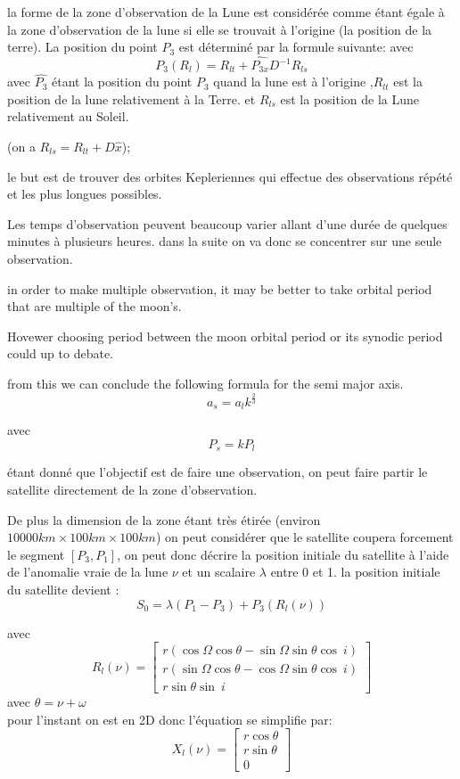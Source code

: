 \documentclass{article} %
\begin{document}
		la forme de la zone d'observation de la Lune est considérée comme étant égale à la zone d'observation de la lune si elle se trouvait à l'origine (la position de la terre). La position du point $P_3$ est déterminé par la formule suivante:
		avec 
		$$
		P_3(R_l)=R_{lt}+\hat{P_{3x}}D^{-1}R_{ls}
		$$
		avec $\hat{P_3}$ étant la position du point $P_3$ quand la lune est à l'origine
		,$R_{lt}$ est la position de la lune relativement à la Terre.
		et $R_{ls}$ est la position de la Lune relativement au Soleil.
		
		(on a $R_{ls} = R_{lt}+D\hat{x}$);
		
		le but est de trouver des orbites Kepleriennes qui effectue des observations répété et les plus longues possibles.
		
		Les temps d'observation peuvent beaucoup varier allant d'une durée de quelques minutes à plusieurs heures.	dans la suite on va donc se concentrer sur une seule observation.
		
		
		in order to make multiple observation, it may be better to take orbital period that are multiple of the moon's.
		
		Hovewer choosing period between the moon orbital period or its synodic period could up to debate.
		
		from this we can conclude the following formula for the semi major axis.
		$$
		a_s=a_lk^{\frac{2}{3}}
		$$
		
		avec
		$$
		P_s=kP_l
		$$
		
		étant donné que l'objectif est de faire une observation, on peut faire partir le satellite directement de la zone d'observation.
		
		De plus la dimension de la zone étant très étirée (environ $10000km\times100km\times100km$) on peut considérer que le satellite coupera forcement le segment $[P_3,P_1]$, on peut donc décrire la position initiale du satellite à l'aide de l'anomalie vraie de la lune $\nu$ et un scalaire $\lambda$ entre 0 et 1. la position initiale du satellite devient : 
		$$
		S_0=\lambda(P_1-P_3)+P_3(R_l(\nu))
		$$
		
		avec 
		$$
		R_l(\nu)=\begin{bmatrix}
			r( \cos\Omega \cos\theta -\sin\Omega \sin\theta \cos\ i)\\
			r( \sin\Omega \cos\theta -\cos\Omega \sin\theta \cos\ i)\\
			r\sin\theta \sin\ i\ 
		\end{bmatrix}
		$$
		avec $\theta = \nu+\omega$ \\
		pour l'instant on est en 2D donc l'équation se simplifie par:
		$$
		X_l(\nu)=\begin{bmatrix}
			r \cos\theta \\
			r \sin\theta \\
			0 
		\end{bmatrix}
		$$
		
\end{document}
